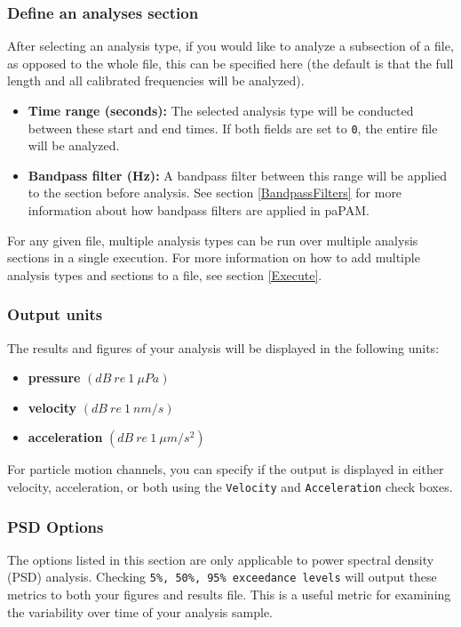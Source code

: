 \documentclass[11pt]{report}
\begin{document}
\subsubsection{Define an analyses section}
After selecting an analysis type, if you would like to analyze a subsection of a file, as opposed to the whole file, this can be specified here (the default is that the full length and all calibrated frequencies will be analyzed).

\begin{itemize}
\item \textbf{Time range (seconds):}  The selected analysis type will be conducted between these start and end times.  If both fields are set to \texttt{0}, the entire file will be analyzed.
\item \textbf{Bandpass filter (Hz):}  A bandpass filter between this range will be applied to the section before analysis.  See section \ref{BandpassFilters} for more information about how bandpass filters are applied in paPAM.
\end{itemize}

For any given file, multiple analysis types can be run over multiple analysis sections in a single execution.  For more information on how to add multiple analysis types and sections to a file, see section \ref{Execute}.

\subsubsection{Output units}

The results and figures of your analysis will be displayed in the following units:
\begin{itemize}
\item \textbf{pressure} $(\mathit{dB\ re\ 1 \  \mu Pa})$
\item \textbf{velocity} $(\mathit{dB\ re\ 1 \ nm/s})$
\item \textbf{acceleration} $(\mathit{dB\ re\ 1\ \mu m/s^2})$
\end{itemize}

For particle motion channels, you can specify if the output is displayed in either velocity, acceleration, or both using the \texttt{Velocity} and \texttt{Acceleration} check boxes.

\subsubsection{PSD Options}
The options listed in this section are only applicable to power spectral density (PSD) analysis.  Checking \texttt{5\%, 50\%, 95\% exceedance levels} will output these metrics to both your figures and results file.  This is a useful metric for examining the variability over time of your analysis sample.
\end{document}

